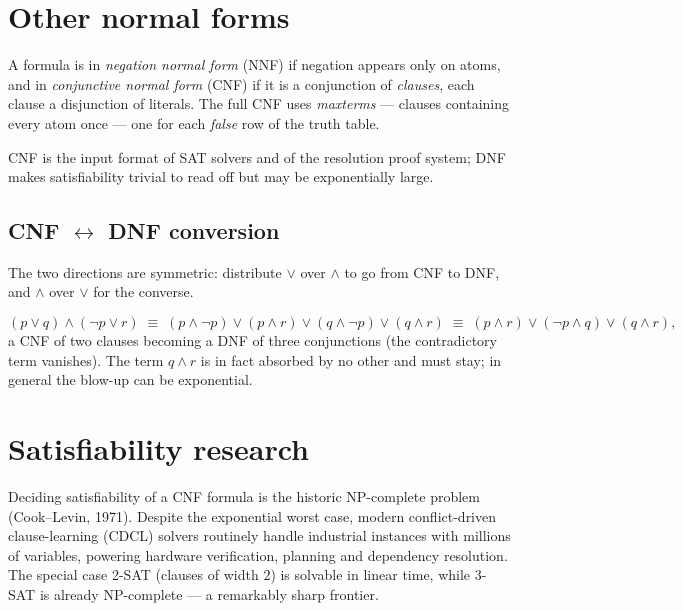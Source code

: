 \section{Other normal forms}

\begin{definition}
A formula is in \emph{negation normal form} (NNF) if negation appears only on
atoms, and in \emph{conjunctive normal form} (CNF) if it is a conjunction of
\emph{clauses}, each clause a disjunction of literals. The full CNF uses
\emph{maxterms} --- clauses containing every atom once --- one for each
\emph{false} row of the truth table.
\end{definition}

CNF is the input format of SAT solvers and of the resolution proof system;
DNF makes satisfiability trivial to read off but may be exponentially large.

\subsection{CNF \texorpdfstring{$\leftrightarrow$}{<->} DNF conversion}

The two directions are symmetric: distribute $\vee$ over $\wedge$ to go from
CNF to DNF, and $\wedge$ over $\vee$ for the converse.

\begin{example}
\[
(p \vee q) \wedge (\neg p \vee r)
\;\equiv\;
(p \wedge \neg p) \vee (p \wedge r) \vee (q \wedge \neg p) \vee (q \wedge r)
\;\equiv\;
(p \wedge r) \vee (\neg p \wedge q) \vee (q \wedge r),
\]
a CNF of two clauses becoming a DNF of three conjunctions (the contradictory
term vanishes). The term $q \wedge r$ is in fact absorbed by no other and must
stay; in general the blow-up can be exponential.
\end{example}

\section{Satisfiability research}

Deciding satisfiability of a CNF formula is the historic NP-complete problem
(Cook--Levin, 1971). Despite the exponential worst case, modern
conflict-driven clause-learning (CDCL) solvers routinely handle industrial
instances with millions of variables, powering hardware verification, planning
and dependency resolution. The special case 2-SAT (clauses of width $2$) is
solvable in linear time, while 3-SAT is already NP-complete --- a remarkably
sharp frontier.

